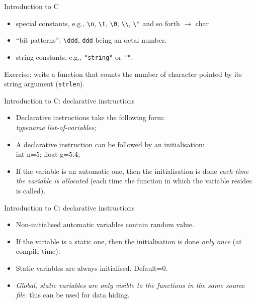 \begin{frame}[fragile]{Introduction to C}
    \begin{itemize}
    \item special constants, e.g., \verb"\n", \verb"\t", \verb"\0", \verb"\\", \verb'\"' and so forth  $\rightarrow$ char
    \item ``bit patterns'': \verb"\ddd", \verb"ddd" being an octal number.
    \item string constants, e.g., {\tt "string"} or {\tt ""}.
\end{itemize}


\vspace{20pt}

Exercise: write a function that counts the number of character
pointed by its string argument ({\tt strlen}).



\end{frame}
\begin{frame}[fragile]{Introduction to C: declarative instructions}
\begin{itemize}
\item Declarative instructions take the following form: \\
	\emph{typename list-of-variables;}
\item A declarative instruction can be followed
by an initialisation: \\
	int n=5; float g=5.4;
\item If the variable is an automatic one, then the initialisation is done
      \emph{each time the variable is allocated\/} (each time the function in which
      the variable resides is called).
\end{itemize}

\end{frame}
\begin{frame}[fragile]{Introduction to C: declarative instructions}
\begin{itemize}
\item Non-initialised automatic variables contain random value.
\item If the variable is a static one, then the initialisation is done
\emph{only once\/} (at compile time).
\item Static variables are always initialised. Default=0.
\item \emph{Global, static variables are only visible to the functions
      in the same source file}: this can be used for data hiding.
\end{itemize}



\end{frame}
